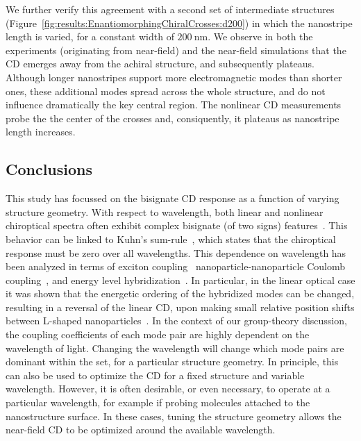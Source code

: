 We further verify this agreement with a second set of intermediate structures (Figure~\ref{fig:results:EnantiomorphingChiralCrosses:d200}) in which the nanostripe length is varied, for a constant width of $\SI{200}{\nano\m}$. We observe in both the experiments (originating from near-field) and the near-field simulations that the CD emerges away from the achiral structure, and subsequently plateaus. Although longer nanostripes support more electromagnetic modes than shorter ones, these additional modes spread across the whole structure, and do not influence dramatically the key central region. The nonlinear CD measurements probe the the center of the crosses and, consiquently, it plateaus as nanostripe length increases.

\subsection{Conclusions}\label{sec:results:EnantiomorphingChiralCrosses:conclusions}

This study has focussed on the bisignate CD response as a function of varying structure geometry. With respect to wavelength, both linear and nonlinear chiroptical spectra often exhibit complex bisignate (of two signs) features~\cite{Li2015, Lee2013, Decker2007, Droulias2013, Plum2009}. This behavior can be linked to Kuhn’s sum-rule~\cite{Kuhn1930}, which states that the chiroptical response must be zero over all wavelengths. This dependence on wavelength has been analyzed in terms of exciton coupling~\cite{Guerrero-Martinez2011} nanoparticle-nanoparticle Coulomb coupling~\cite{Fan2010}, and energy level hybridization~\cite{Auguie2011a}.
In particular, in the linear optical case it was shown that the energetic ordering of the hybridized modes can be changed, resulting in a reversal of the linear CD, upon making small relative position shifts between L-shaped nanoparticles~\cite{Hentschel2015}.
In the context of our group-theory discussion, the coupling coefficients of each mode pair are highly dependent on the wavelength of light. Changing the wavelength will change which mode pairs are dominant within the set, for a particular structure geometry. In principle, this can also be used to optimize the CD for a fixed structure and variable wavelength. However, it is often desirable, or even necessary, to operate at a particular wavelength, for example if probing molecules attached to the nanostructure surface. In these cases, tuning the structure geometry allows the near-field CD to be optimized around the available wavelength.

